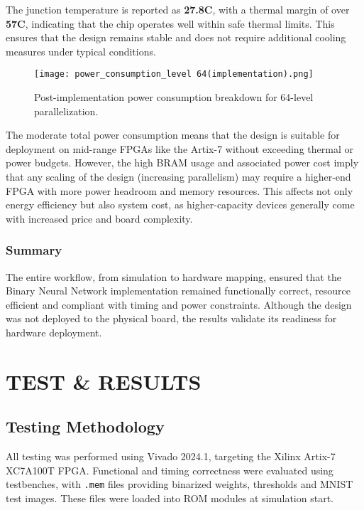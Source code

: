 \documentclass[a4paper,12pt]{report}
\begin{document}
The junction temperature is reported as \textbf{27.8\textdegree C}, with a thermal margin of over \textbf{57\textdegree C}, indicating that the chip operates well within safe thermal limits. This ensures that the design remains stable and does not require additional cooling measures under typical conditions.

\begin{figure}[H]
    \centering
    \texttt{[image: power\_consumption\_level 64(implementation).png]}
    \caption{Post-implementation power consumption breakdown for 64-level parallelization.}
    \label{fig:power_analysis}
\end{figure}

The moderate total power consumption means that the design is suitable for deployment on mid-range FPGAs like the Artix-7 without exceeding thermal or power budgets. However, the high BRAM usage and associated power cost imply that any scaling of the design (increasing parallelism) may require a higher-end FPGA with more power headroom and memory resources. This affects not only energy efficiency but also system cost, as higher-capacity devices generally come with increased price and board complexity.

\subsection{Summary}
The entire workflow, from simulation to hardware mapping, ensured that the Binary Neural Network implementation remained functionally correct, resource efficient and compliant with timing and power constraints. Although the design was not deployed to the physical board, the results validate its readiness for hardware deployment.


\clearpage
\chapter{TEST \& RESULTS}
\label{chapter:test_and_results}

\section{Testing Methodology}
All testing was performed using Vivado 2024.1, targeting the Xilinx Artix-7 XC7A100T FPGA. Functional and timing correctness were evaluated using testbenches, with \texttt{.mem} files providing binarized weights, thresholds and MNIST test images. These files were loaded into ROM modules at simulation start.
\end{document}
